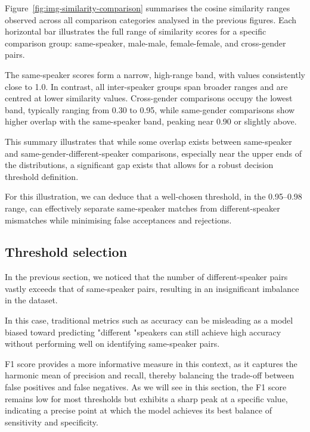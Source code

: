 \documentclass[conference]{IEEEtran}
\begin{document}
	Figure~\ref{fig:img-similarity-comparison} summarises the cosine similarity ranges observed across all comparison categories analysed in the previous figures. Each horizontal bar illustrates the full range of similarity scores for a specific comparison group: same-speaker, male-male, female-female, and cross-gender pairs.
	
	The same-speaker scores form a narrow, high-range band, with values consistently close to 1.0. In contrast, all inter-speaker groups span broader ranges and are centred at lower similarity values. Cross-gender comparisons occupy the lowest band, typically ranging from 0.30 to 0.95, while same-gender comparisons show higher overlap with the same-speaker band, peaking near 0.90 or slightly above.
	
	This summary illustrates that while some overlap exists between same-speaker and same-gender-different-speaker comparisons, especially near the upper ends of the distributions, a significant gap exists that allows for a robust decision threshold definition.
	
	For this illustration, we can deduce that a well-chosen threshold, in the 0.95–0.98 range, can effectively separate same-speaker matches from different-speaker mismatches while minimising false acceptances and rejections.
	
	
	\subsection{Threshold selection}
	
	In the previous section, we noticed that the number of different-speaker pairs vastly exceeds that of same-speaker pairs, resulting in an insignificant imbalance in the dataset.
	
	In this case, traditional metrics such as accuracy can be misleading as a model biased toward predicting "different "speakers can still achieve high accuracy without performing well on identifying same-speaker pairs. 
	
	F1 score provides a more informative measure in this context,  as it captures the harmonic mean of precision and recall, thereby balancing the trade-off between false positives and false negatives. As we will see in this section, the F1 score remains low for most thresholds but exhibits a sharp peak at a specific value, indicating a precise point at which the model achieves its best balance of sensitivity and specificity. 
	
\end{document}
